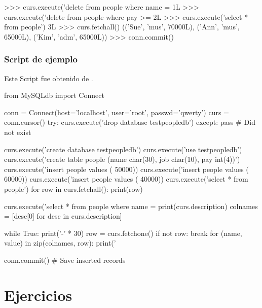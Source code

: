 \begin{pyglist} [language=python]
>>> curs.execute('delete from people where name = %
1L
>>> curs.execute('delete from people where pay >= %
2L
>>> curs.execute('select * from people')
3L
>>> curs.fetchall()
(('Sue', 'mus', 70000L), ('Ann', 'mus', 65000L), ('Kim', 'adm', 65000L))
>>> conn.commit()
\end{pyglist}

\subsubsection{Script de ejemplo}

Este Script fue obtenido de \cite{Lutz2011}.

\begin{pyglist} [language=python]
from MySQLdb import Connect

conn = Connect(host='localhost', user='root', passwd='qwerty')
curs = conn.cursor()
try:
    curs.execute('drop database testpeopledb')
except:
    pass  # Did not exist

curs.execute('create database testpeopledb')
curs.execute('use testpeopledb')
curs.execute('create table people (name char(30), job char(10), pay int(4))')
curs.execute('insert people values (%
50000))
curs.execute('insert people values (%
60000))
curs.execute('insert people values (%
40000))
curs.execute('select * from people')
for row in curs.fetchall():
    print(row)
    
curs.execute('select * from people where name = %
print(curs.description)
colnames = [desc[0] for desc in curs.description]

while True:
    print('-' * 30)
    row = curs.fetchone()
    if not row: break
    for (name, value) in zip(colnames, row):
        print('%
    
conn.commit()       # Save inserted records
\end{pyglist}



\section{Ejercicios}

